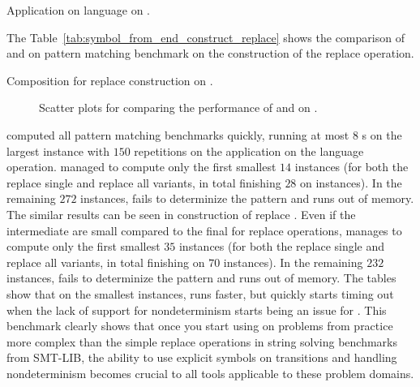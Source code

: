 \begin{table}[ht]
  \centering
  
  \caption{
    Application on language on \symbolFromEnd.
  }
  \label{tab:symbol_from_end_apply_language}
\end{table}

The Table~\ref{tab:symbol_from_end_construct_replace} shows the comparison of \mata and \mona on pattern matching benchmark \symbolFromEnd on the construction of the replace \nft operation.

\begin{table}[ht]
  \centering
  
  \caption{
    Composition for replace construction on \symbolFromEnd.
  }
  \label{tab:symbol_from_end_construct_replace}
\end{table}

\begin{figure}[ht]
    \centering
    \quad
    \caption{
      Scatter plots for comparing the performance of \mata and \mona on \symbolFromEnd.
    }
    \label{fig:symbol_from_end}%
\end{figure}

\mata computed all pattern matching benchmarks quickly, running at most $8$ s on the largest instance with $150$ repetitions on the application on the language operation.
\mona managed to compute only the first smallest $14$ instances (for both the replace single and replace all variants, in total finishing $28$ on instances).
In the remaining $272$ instances, \mona fails to determinize the pattern and runs out of memory.
The similar results can be seen in construction of replace \nfts. Even if the intermediate \nfts are small compared to the final \nfts for replace operations, \mona manages to compute only the first smallest $35$ instances (for both the replace single and replace all variants, in total finishing on $70$ instances).
In the remaining $232$ instances, \mona fails to determinize the pattern and runs out of memory.
The tables show that on the smallest instances, \mona runs faster, but quickly starts timing out when the lack of support for nondeterminism starts being an issue for \mona.
This benchmark clearly shows that once you start using \nfts on problems from practice more complex than the simple replace operations in string solving benchmarks from SMT-LIB, the ability to use explicit symbols on transitions and handling nondeterminism becomes crucial to all tools applicable to these problem domains.

